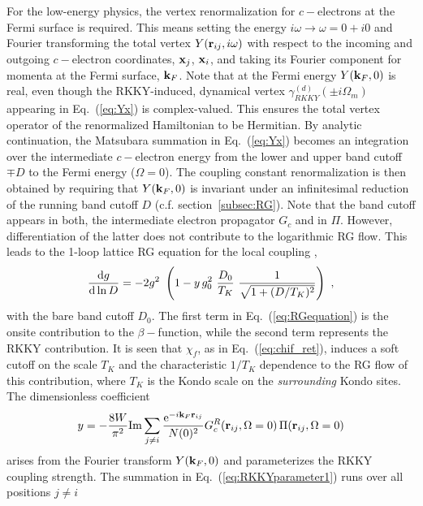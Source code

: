 \documentclass[12pt,twoside]{article}
\newcommand{\Eq}[1]{Eq.~(\ref{#1})}
\begin{document}
 

For the low-energy physics, the vertex renormalization for $c-$electrons 
at the Fermi surface is required.   
This means setting the energy $i\omega\to\omega =0+i0$  and 
Fourier transforming the total vertex 
$Y({\bf r}_{ij}, i\omega)$ with respect to the incoming and outgoing 
$c-$electron coordinates, ${\bf x}_j$, ${\bf x}_i$, and taking 
its Fourier component for momenta at the Fermi surface, ${\bf k}_F$. 
Note that at the Fermi energy  
$Y({\bf k}_F, 0)$ is real, even though the RKKY-induced, 
dynamical vertex $\gamma^{(d)}_{RKKY}(\pm i\Omega_m)$ appearing in 
\Eq{eq:Yx} is complex-valued. This ensures  
the total vertex operator of the renormalized Hamiltonian to be
Hermitian. By analytic continuation, the Matsubara summation
in \Eq{eq:Yx} becomes an integration over 
the intermediate $c-$electron energy from the lower and upper 
band cutoff $\mp D$ to the Fermi energy ($\Omega=0$). The 
coupling constant renormalization is then obtained  
by requiring that $Y({\bf k}_F, 0)$ is invariant under an infinitesimal 
reduction of the running band cutoff $D$ (c.f. section~\ref{subsec:RG}).
Note that the band cutoff appears in both, the
intermediate electron propagator $G_c$ and in $\Pi$.
However, differentiation of the latter does not contribute to 
the logarithmic RG flow. This leads to the 1-loop lattice RG 
equation for the local coupling \cite{Nejati17}, 
\begin{equation}
\frac{{\rm d}g}{{\rm d}\ln  D} = -2 g^2\ 
\left( 1 - y\, g_0^2 \ \frac{D_0}{T_K}\ \frac{1}{\sqrt{1+(D/T_K)^2}} 
\right) \ ,
\label{eq:RGequation}
\end{equation}
with the bare band cutoff $D_0$. 
The first term in \Eq{eq:RGequation} is the onsite 
contribution to the $\beta-$function, 
while the second term represents the RKKY contribution. 
It is seen that $\chi_f$, as in \Eq{eq:chif_ret},
induces a soft cutoff 
on the scale $T_K$ and the characteristic
$1/T_K$ dependence to the RG flow of this contribution, where 
$T_K$ is the Kondo scale on the {\it surrounding} Kondo sites.      
The dimensionless coefficient 
\begin{equation}
y=-\frac{8W}{\pi ^2} {\rm Im} \sum_{j\neq i}
\frac{{\rm e}^{-i{\bf k}_F{\bf r}_{ij}}} {N(0)^2}
 G_c^R({\bf r}_{ij}, \Omega=0 ) \,
\Pi({\bf r}_{ij}, \Omega=0 ) 
\label{eq:RKKYparameter1}
\end{equation}
arises from the Fourier transform $Y({\bf k}_F, 0)$ and  
parameterizes the RKKY coupling strength. The summation 
in \Eq{eq:RKKYparameter1} runs over all positions $j\neq i$ 
\end{document}
